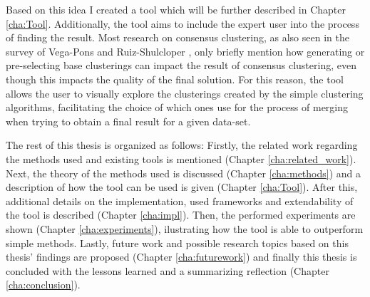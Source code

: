Based on this idea I created a tool which will be further described in Chapter \ref{cha:Tool}. Additionally, the tool aims to include the expert user into the process of finding the result. Most research on consensus clustering, as also seen in the survey of Vega-Pons and Ruiz-Shulcloper \cite{survey1}, only briefly mention how generating or pre-selecting base clusterings can impact the result of consensus clustering, even though this impacts the quality of the final solution. For this reason, the tool allows the user to visually explore the clusterings created by the simple clustering algorithms, facilitating the choice of which ones use for the process of merging when trying to obtain a final result for a given data-set.

The rest of this thesis is organized as follows: Firstly, the related work regarding the methods used and existing tools is mentioned (Chapter \ref{cha:related_work}). Next, the theory of the methods used is discussed (Chapter \ref{cha:methods}) and a description of how the tool can be used is given (Chapter \ref{cha:Tool}). After this, additional details on the implementation, used frameworks and extendability of the tool is described (Chapter \ref{cha:impl}). Then, the performed experiments are shown (Chapter \ref{cha:experiments}), ilustrating how the tool is able to outperform simple methods. Lastly, future work and possible research topics based on this thesis' findings are proposed (Chapter \ref{cha:futurework}) and finally this thesis is concluded with the lessons learned and a summarizing reflection (Chapter \ref{cha:conclusion}).
